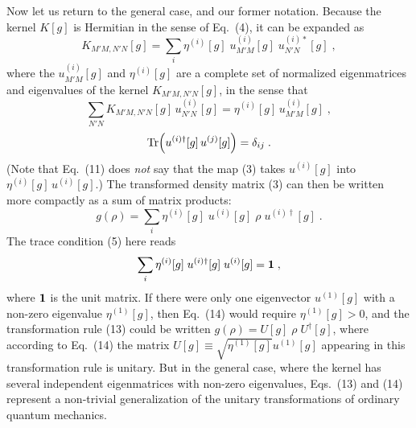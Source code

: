 Now let us return to the general case, and our former notation.  Because the kernel $K[g]$ is Hermitian in the sense of Eq.~(4), it can be expanded as
\begin{equation}
K_{M'M,N'N}[g]=\sum_i \eta^{(i)}[g]\;u^{(i)}_{M'M}[g]\;u^{(i)*}_{N'N}[g]\;,
\end{equation}
where the $u^{(i)}_{M'M}[g]$ and $\eta^{(i)}[g]$ are a complete set of normalized eigenmatrices and eigenvalues of the kernel $K_{M'M,N'N}[g]$, in the sense that
\begin{equation}
\sum_{N'N}K_{M'M,N'N}[g]\,u^{(i)}_{N'N}[g]=\eta^{(i)}[g]\,u^{(i)}_{M'M}[g]\;,
\end{equation}
\begin{equation}
{\rm Tr}\Big(u^{(i)\dagger}[g]\,u^{(j)}[g]\Big)=\delta_{ij}\;.
\end{equation}
(Note that Eq.~(11) does {\em not} say that the map (3)  takes $u^{(i)}[g]$ into  $\eta^{(i)}[g]\,u^{(i)}[g]$.)
The transformed density matrix (3) can then be written more compactly as a sum of  matrix products:
\begin{equation}
g(\rho)=\sum_i \eta^{(i)}[g]\;u^{(i)}[g]\;\rho\;u^{(i)\dagger}[g]\;.
\end{equation}
The  trace condition (5) here reads
\begin{equation}
\sum_i \eta^{(i)}[g]\;u^{(i)\dagger}[g]\;u^{(i)}[g]=\mbox{\boldmath{$1$}}\;,
\end{equation}
where $\mbox{\boldmath{$1$}}$ is the unit matrix.
If there were only one eigenvector $u^{(1)}[g]$ with a non-zero eigenvalue $\eta^{(1)}[g]$, then Eq.~(14) would require $\eta^{(1)}[g]>0$, and the transformation rule (13) could be written $g(\rho)=U[g]\;\rho\;U^{\dagger}[g]$, where according to Eq.~(14) the matrix $U[g]\equiv \sqrt{\eta^{(1)}[g]}u^{(1)}[g]$ appearing in this transformation rule  is unitary.    But in the general case, where the kernel has  several independent eigenmatrices with non-zero eigenvalues,  Eqs.~(13) and (14)  represent  a non-trivial generalization of the unitary transformations of ordinary quantum mechanics.


